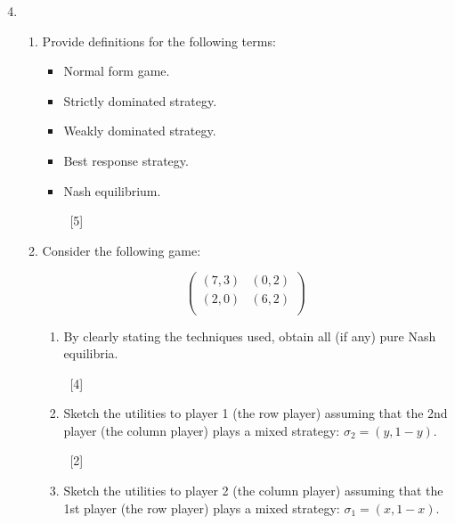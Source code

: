 \documentclass[12pt,a4paper]{article}
\renewcommand{\labelenumi}{\arabic{enumi}} %
\begin{document}
\begin{enumerate}
\setcounter{enumi}{3}

\renewcommand\labelenumi{\bfseries\theenumi.}

\item

    \begin{enumerate}
        \item Provide definitions for the following terms:
            \begin{itemize}
                \item Normal form game.

                \item Strictly dominated strategy.

                \item Weakly dominated strategy.

                \item Best response strategy.

                \item Nash equilibrium.

                    ~\hfill{[5]}
            \end{itemize}

        \item     Consider the following game:

            \[\begin{pmatrix}
            (7,3) & (0,2)\\
            (2,0) & (6,2)\\
            \end{pmatrix}\]

            \begin{enumerate}
            \item By clearly stating the techniques used, obtain all (if any) pure Nash equilibria.

            ~\hfill{[4]}

            \item Sketch the utilities to player 1 (the row player) assuming that the 2nd player (the column player) plays a mixed strategy: $\sigma_2 = (y,1-y)$.

            ~\hfill{[2]}

            \item Sketch the utilities to player 2 (the column player) assuming that the 1st player (the row player) plays a mixed strategy: $\sigma_1 = (x,1-x)$.


\end{enumerate}
\end{enumerate}
\end{enumerate}
\end{document}
